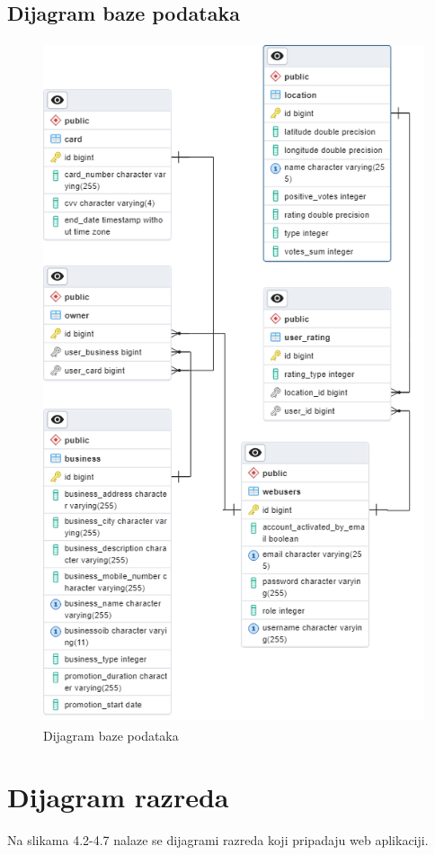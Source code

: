 			\subsection{Dijagram baze podataka}
			\begin{figure}[H]
			    \centering
			    \includegraphics[height=20cm]{slike/ERD.png} %
			    \caption{Dijagram baze podataka}
			    \label{fig:ERD} %
		    \end{figure}
			
		\pagebreak
		\section{Dijagram razreda}
            Na slikama 4.2-4.7 nalaze se dijagrami razreda koji pripadaju web aplikaciji.
            \\
            
